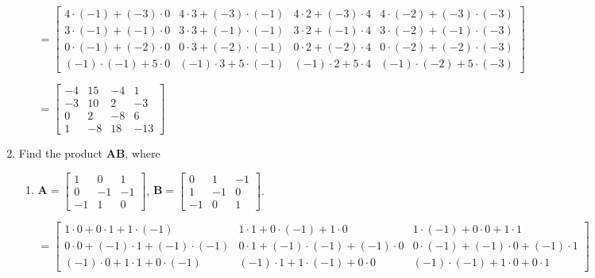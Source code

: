 \documentclass[11pt]{article}
\begin{document}
\begin{enumerate}[label=\textbf{\arabic*.}]
\begin{enumerate}[label=\textbf{\alph*)}]
		$= 
		\begin{bmatrix}
			4 \cdot (-1) + (-3) \cdot 0 & 4 \cdot 3 + (-3) \cdot (-1) & 4 \cdot 2 + (-3) \cdot 4 & 4 \cdot (-2) + (-3) \cdot (-3) \\
			3 \cdot (-1) + (-1) \cdot 0 & 3 \cdot 3 + (-1) \cdot (-1) & 3 \cdot 2 + (-1) \cdot 4 & 3 \cdot (-2) + (-1) \cdot (-3) \\
			0 \cdot (-1) + (-2) \cdot 0 & 0 \cdot 3 + (-2) \cdot (-1) & 0 \cdot 2 + (-2) \cdot 4 & 0 \cdot (-2) + (-2) \cdot (-3) \\
			(-1) \cdot (-1) + 5 \cdot 0 & (-1) \cdot 3 + 5 \cdot (-1) & (-1) \cdot 2 + 5 \cdot 4 & (-1) \cdot (-2) + 5 \cdot (-3)
		\end{bmatrix}$
	
		$ = 
		\begin{bmatrix}
			-4 & 15 & -4 & 1 \\
			-3 & 10 & 2 & -3 \\
			0 & 2 & -8 & 6 \\
			1 & -8 & 18 & -13
		\end{bmatrix}$
	\end{enumerate}

	\item Find the product \textbf{AB}, where
	
	\begin{enumerate}[label=\textbf{\alph*)}]
		\item $\textbf{A} =
		\begin{bmatrix}
			1 & 0 & 1 \\
			0 & -1 & -1 \\
			-1 & 1 & 0
		\end{bmatrix}$, $\textbf{B} = 
		\begin{bmatrix}
			0 & 1 & -1 \\
			1 & -1 & 0 \\
			-1 & 0 & 1
		\end{bmatrix}$.
	
		$= 
		\begin{bmatrix}
			1 \cdot 0 + 0 \cdot 1 + 1 \cdot (-1) & 1 \cdot 1 + 0 \cdot (-1) + 1 \cdot 0 &1 \cdot (-1) + 0 \cdot 0 + 1 \cdot 1 \\
			0 \cdot 0 + (-1) \cdot 1 + (-1) \cdot (-1) & 0 \cdot 1 + (-1) \cdot (-1) + (-1) \cdot 0 & 0 \cdot (-1) + (-1) \cdot 0 + (-1) \cdot 1\\
			(-1) \cdot 0 + 1 \cdot 1 + 0 \cdot (-1) & (-1) \cdot 1 + 1 \cdot (-1) + 0 \cdot 0 & (-1) \cdot (-1) + 1 \cdot 0 + 0 \cdot 1
		\end{bmatrix}$
	

\end{enumerate}
\end{enumerate}
\end{document}
